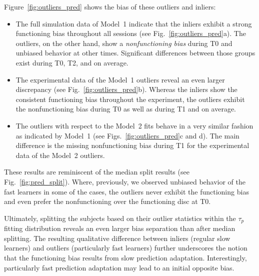 \documentclass[a4paper]{scrreprt}
\begin{document}
Figure~\ref{fig:outliers_pred} shows the bias of these outliers and inliers:
\begin{itemize}
\item The full simulation data of Model~1 indicate that the inliers exhibit a strong functioning bias throughout all sessions (see Fig.~\ref{fig:outliers_pred}a). The outliers, on the other hand, show a \textit{nonfunctioning bias} during T0 and unbiased behavior at other times. Significant differences between those groups exist during T0, T2, and on average.
\item The experimental data of the Model~1 outliers reveal an even larger discrepancy (see Fig.~\ref{fig:outliers_pred}b). Whereas the inliers show the consistent functioning bias throughout the experiment, the outliers exhibit the nonfunctioning bias during T0 as well as during T1 and on average.
\item The outliers with respect to the Model~2 fits behave in a very similar fashion as indicated by Model~1 (see Figs.~\ref{fig:outliers_pred}c and d). The main difference is the missing nonfunctioning bias during T1 for the experimental data of the Model~2 outliers.
\end{itemize}
These results are reminiscent of the median split results (see Fig.~\ref{fig:pred_split}). Where, previously, we observed unbiased behavior of the fast learners in some of the cases, the outliers never exhibit the functioning bias and even prefer the nonfunctioning over the functioning disc at T0.

Ultimately, splitting the subjects based on their outlier statistics within the $\tau_p$ fitting distribution reveals an even larger bias separation than after median splitting. The resulting qualitative difference between inliers (regular slow learners) and outliers (particularly fast learners) further underscores the notion that the functioning bias results from slow prediction adaptation. Interestingly, particularly fast prediction adaptation may lead to an initial opposite bias.
\end{document}
